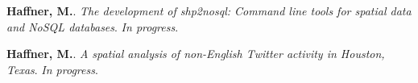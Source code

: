 \begin{cventries}
   \cventry
      {}
      {}
      {}
      {}
      {
        \begin{cvitems}
          \vspace{-4mm}
        \item {\textbf{Haffner, M.}.
            \textit{The development of shp2nosql: Command line tools for spatial data and NoSQL databases}. \textit{In progress}.} \\
          \vspace{-2mm}
        \item
          {\textbf{Haffner, M.}.
            \textit{A spatial analysis of non-English Twitter activity in Houston, Texas}. \textit{In progress}.} \\
        \end{cvitems}
    }
\end{cventries}
